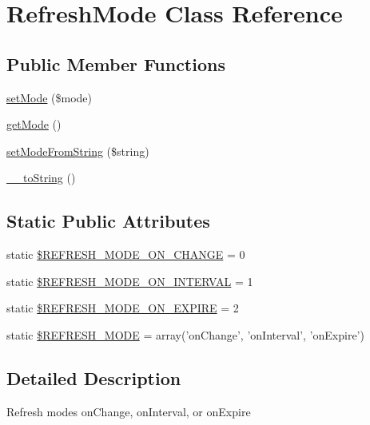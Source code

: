 \hypertarget{classRefreshMode}{
\section{RefreshMode Class Reference}
\label{dc/de2/classRefreshMode}
}
\subsection*{Public Member Functions}
\begin{DoxyCompactItemize}
\item 
\hyperlink{classRefreshMode_ad34019622dcf43c2ae98f8b2d6b95450}{setMode} (\$mode)
\item 
\hyperlink{classRefreshMode_acbe027174bb439817ab3e1c9b2aaa21d}{getMode} ()
\item 
\hyperlink{classRefreshMode_a4469ce8892fa751ab02ce93e25010754}{setModeFromString} (\$string)
\item 
\hyperlink{classRefreshMode_a2bfef1ad2a8cf735920817e44d1bc6e5}{\_\-\_\-toString} ()
\end{DoxyCompactItemize}
\subsection*{Static Public Attributes}
\begin{DoxyCompactItemize}
\item 
static \hyperlink{classRefreshMode_a6ba540745a69b8b4920d3e9f263213a2}{\$REFRESH\_\-MODE\_\-ON\_\-CHANGE} = 0
\item 
static \hyperlink{classRefreshMode_aad1d173eaf17ec896b64edb760c8c2be}{\$REFRESH\_\-MODE\_\-ON\_\-INTERVAL} = 1
\item 
static \hyperlink{classRefreshMode_a674324945858a4c20652492f08f439c8}{\$REFRESH\_\-MODE\_\-ON\_\-EXPIRE} = 2
\item 
static \hyperlink{classRefreshMode_af9a863d2861023ae46c1e309b2297cc1}{\$REFRESH\_\-MODE} = array('onChange', 'onInterval', 'onExpire')
\end{DoxyCompactItemize}


\subsection{Detailed Description}
Refresh modes onChange, onInterval, or onExpire 

